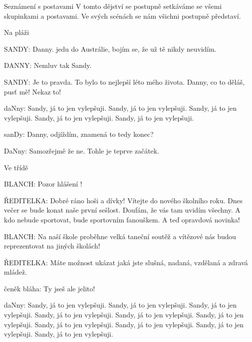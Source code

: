 ﻿\load[makra]
\load[mriezka]

\beginscenar




\act Seznámení s postavami
V tomto dějství se postupně setkáváme se všemi skupinkami a postavami. Ve svých scénách se nám všichni postupně představí.

\scene Na pláži

\rep SANDY: Danny. jedu do Austrálie, bojím se, že už tě nikdy neuvidím. 

\rep DANNY: Nemluv tak Sandy.   

\rep SANDY: Je to pravda. To bylo to nejlepší léto mého života.  Danny, co to děláš, pusť mě! Nekaz to!

\rep daNny: Sandy, já to jen vylepšuji. Sandy, já to jen vylepšuji. Sandy, já to jen vylepšuji. Sandy, já to jen vylepšuji. Sandy, já to jen vylepšuji. 

\rep sanDy: Danny, odjíždím, znamená to tedy konec?

\rep DaNny: Samozřejmě že ne. Tohle je teprve začátek. 

\scene Ve třídě 

\rep BLANCH:            Pozor hlášení ! 

\rep ŘEDITELKA:                  Dobré ráno hoši a dívky! Vítejte do nového školního roku.
    Dnes večer se bude konat naše první sešlost. Doufám, že vás tam  uvidím všechny. A kdo nebude sportovat, bude sportovním fanouškem. A  teď opravdová novinka!  

\rep BLANCH:             Na naší škole proběhne velká taneční soutěž  a vítězové nás budou reprezentovat na jiných školách!

\rep ŘEDITELKA:         Máte možnost ukázat jaká jste slušná, nadaná, vzdělaná a zdravá mládež.       


\scene


\rep čeněk bláha: Ty jseš ale jelito!

\rep daNny: Sandy, já to jen vylepšuji. Sandy, já to jen vylepšuji. Sandy, já to jen vylepšuji. Sandy, já to jen vylepšuji. Sandy, já to jen vylepšuji. Sandy, já to jen vylepšuji. Sandy, já to jen vylepšuji. Sandy, já to jen vylepšuji. Sandy, já to jen vylepšuji. Sandy, já to jen vylepšuji. 

